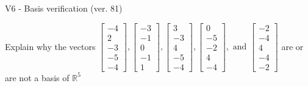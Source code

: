 \begin{exercise}
  \begin{exerciseTitle}V6 - Basis verification (ver. 81)\end{exerciseTitle}
  \begin{exerciseStatement}
    Explain why the vectors \(\left[\begin{array}{r}
-4 \\
2 \\
-3 \\
-5 \\
-4
\end{array}\right] , \left[\begin{array}{r}
-3 \\
-1 \\
0 \\
-1 \\
1
\end{array}\right] , \left[\begin{array}{r}
3 \\
-3 \\
4 \\
-5 \\
-4
\end{array}\right] , \left[\begin{array}{r}
0 \\
-5 \\
-2 \\
4 \\
-4
\end{array}\right] , \text{ and } \left[\begin{array}{r}
-2 \\
-4 \\
4 \\
-4 \\
-2
\end{array}\right]\) are or are not a basis of \(\mathbb{R}^5\)	



\end{exerciseStatement}
\end{exercise}
